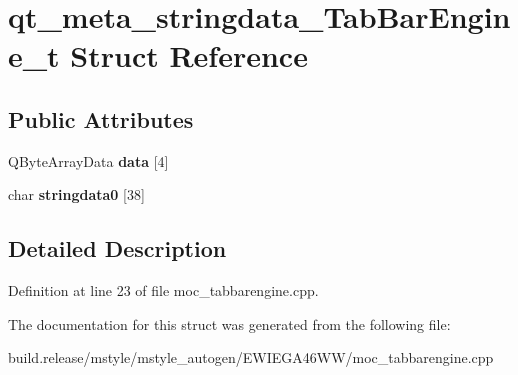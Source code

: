 \hypertarget{structqt__meta__stringdata___tab_bar_engine__t}{}\section{qt\+\_\+meta\+\_\+stringdata\+\_\+\+Tab\+Bar\+Engine\+\_\+t Struct Reference}
\label{structqt__meta__stringdata___tab_bar_engine__t}
\subsection*{Public Attributes}
\begin{DoxyCompactItemize}
\item 
\mbox{\label{structqt__meta__stringdata___tab_bar_engine__t_a294dba8d35c09ae55e265b0735acc3fb}} 
Q\+Byte\+Array\+Data {\bfseries data} \mbox{[}4\mbox{]}
\item 
\mbox{\label{structqt__meta__stringdata___tab_bar_engine__t_a0cd64299bab5611d70c62d840dcbfc3a}} 
char {\bfseries stringdata0} \mbox{[}38\mbox{]}
\end{DoxyCompactItemize}


\subsection{Detailed Description}


Definition at line 23 of file moc\+\_\+tabbarengine.\+cpp.



The documentation for this struct was generated from the following file\+:\begin{DoxyCompactItemize}
\item 
build.\+release/mstyle/mstyle\+\_\+autogen/\+E\+W\+I\+E\+G\+A46\+W\+W/moc\+\_\+tabbarengine.\+cpp\end{DoxyCompactItemize}
